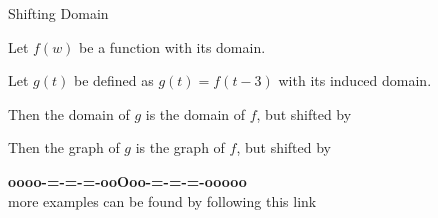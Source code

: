 \documentclass{ximera}
\begin{document}
\begin{example} Shifting Domain


Let $f(w)$ be a function with its domain.

Let $g(t)$ be defined as $g(t) = f(t-3)$ with its induced domain.


Then the domain of $g$ is the domain of $f$, but shifted  by 


Then the graph of $g$ is the graph of $f$, but shifted  by 




\end{example}


















\begin{center}
\textbf{\textcolor{green!50!black}{oooo-=-=-=-ooOoo-=-=-=-ooooo}} \\

more examples can be found by following this link\\ 

\end{center}
\end{document}
